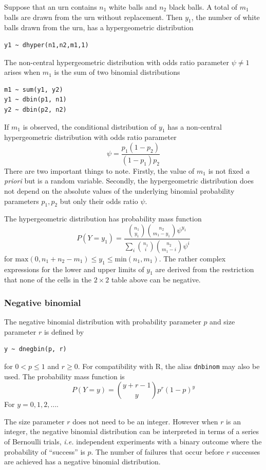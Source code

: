 \documentclass[11pt, a4paper, titlepage]{report}
\newcommand{\R}{\textsf{R}}
\begin{document}
{Suppose that an urn contains $n_1$ white balls and $n_2$ black balls.
A total of $m_1$ balls are drawn from the urn without replacement.
Then $y_1$, the number of white balls drawn from the urn, has a
hypergeometric distribution
\begin{verbatim}
y1 ~ dhyper(n1,n2,m1,1)
\end{verbatim}

The non-central hypergeometric distribution with odds ratio parameter
$\psi \neq 1$ arises when $m_1$ is the sum of two binomial distributions
\begin{verbatim}
m1 ~ sum(y1, y2)
y1 ~ dbin(p1, n1)
y2 ~ dbin(p2, n2)
\end{verbatim}
If $m_1$ is observed, the conditional distribution of $y_1$ has a
non-central hypergeometric distribution with odds ratio parameter
\[
\psi = \frac{p_1 (1 - p_2)}{(1 - p_1) p_2}
\]
There are two important things to note. Firstly, the value of $m_1$ is
not fixed {\em a priori} but is a random variable. Secondly, the
hypergeometric distribution does not depend on the absolute values of
the underlying binomial probability parameters $p_1, p_2$ but only
their odds ratio $\psi$.

The hypergeometric distribution has probability mass function
\[
P(Y=y_1) = \frac{ {n_1 \choose y_1} {n_2 \choose m_1 - y_1} \psi^{y_1}}
{ \sum_i {n_1 \choose i} {n_2 \choose m_1 - i} \psi^i}
\]
for $\text{max}(0, n_1 + n_2 - m_1) \leq y_1 \leq
\text{min}(n_1,m_1)$.  The rather complex expressions for the lower
and upper limits of $y_1$ are derived from the restriction that none
of the cells in the $2 \times 2$ table above can be negative.

\subsubsection{Negative binomial}

The negative binomial distribution with probability parameter $p$
and size parameter $r$ is defined by
\begin{verbatim}
y ~ dnegbin(p, r)
\end{verbatim}
for $0 < p \leq 1$ and $r \geq 0$. For compatibility with \R, the
alias \texttt{dnbinom} may also be used. The probability mass function is
\[
P(Y=y) = {y + r -1 \choose y} p^r (1-p)^y
\]
For $y = 0, 1, 2, \ldots$.

The size parameter $r$ does not need to be an integer. However when
$r$ is an integer, the negative binomial distribution can be
interpreted in terms of a series of Bernoulli trials, {\em i.e.}
independent experiments with a binary outcome where the probability of
``success'' is $p$. The number of failures that occur before $r$
successes are achieved has a negative binomial distribution.

}
\end{document}
